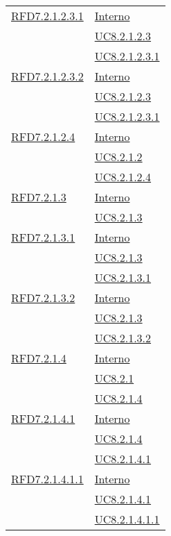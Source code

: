 \begin{longtable}{|>{\centering}m{5cm}|m{5cm}<{\centering}|}
\hyperlink{RFD7.2.1.2.3.1}{RFD7.2.1.2.3.1} & \hyperlink{Interno}{Interno}\\
& \hyperref[UC8.2.1.2.3]{UC8.2.1.2.3}\\
& \hyperref[UC8.2.1.2.3.1]{UC8.2.1.2.3.1}\\ \hline

\hyperlink{RFD7.2.1.2.3.2}{RFD7.2.1.2.3.2} & \hyperlink{Interno}{Interno}\\
& \hyperref[UC8.2.1.2.3]{UC8.2.1.2.3}\\
& \hyperref[UC8.2.1.2.3.1]{UC8.2.1.2.3.1}\\ \hline

\hyperlink{RFD7.2.1.2.4}{RFD7.2.1.2.4} & \hyperlink{Interno}{Interno}\\
& \hyperref[UC8.2.1.2]{UC8.2.1.2}\\
& \hyperref[UC8.2.1.2.4]{UC8.2.1.2.4}\\ \hline

\hyperlink{RFD7.2.1.3}{RFD7.2.1.3} & \hyperlink{Interno}{Interno}\\
& \hyperref[UC8.2.1.3]{UC8.2.1.3}\\ \hline

\hyperlink{RFD7.2.1.3.1}{RFD7.2.1.3.1} & \hyperlink{Interno}{Interno}\\
& \hyperref[UC8.2.1.3]{UC8.2.1.3}\\
& \hyperref[UC8.2.1.3.1]{UC8.2.1.3.1}\\ \hline

\hyperlink{RFD7.2.1.3.2}{RFD7.2.1.3.2} & \hyperlink{Interno}{Interno}\\
& \hyperref[UC8.2.1.3]{UC8.2.1.3}\\
& \hyperref[UC8.2.1.3.2]{UC8.2.1.3.2}\\ \hline

\hyperlink{RFD7.2.1.4}{RFD7.2.1.4} & \hyperlink{Interno}{Interno}\\
& \hyperref[UC8.2.1]{UC8.2.1}\\
& \hyperref[UC8.2.1.4]{UC8.2.1.4}\\ \hline

\hyperlink{RFD7.2.1.4.1}{RFD7.2.1.4.1} & \hyperlink{Interno}{Interno}\\
& \hyperref[UC8.2.1.4]{UC8.2.1.4}\\
& \hyperref[UC8.2.1.4.1]{UC8.2.1.4.1}\\ \hline

\hyperlink{RFD7.2.1.4.1.1}{RFD7.2.1.4.1.1} & \hyperlink{Interno}{Interno}\\
& \hyperref[UC8.2.1.4.1]{UC8.2.1.4.1}\\
& \hyperref[UC8.2.1.4.1.1]{UC8.2.1.4.1.1}\\ \hline


\end{longtable}
